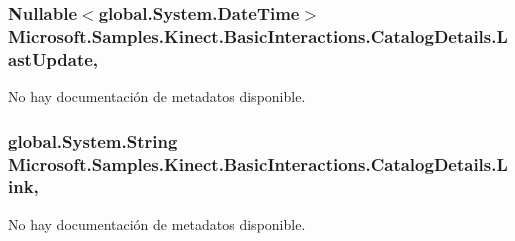 \hypertarget{class_microsoft_1_1_samples_1_1_kinect_1_1_basic_interactions_1_1_catalog_details_a43dfdfa238709c3c3c631fcdc8d0767e}{
\subsubsection[{Last\-Update}]{\setlength{\rightskip}{0pt plus 5cm}Nullable$<$global.\-System.\-Date\-Time$>$ Microsoft.\-Samples.\-Kinect.\-Basic\-Interactions.\-Catalog\-Details.\-Last\-Update\hspace{0.3cm}{\ttfamily [get]}, {\ttfamily [set]}}}\label{class_microsoft_1_1_samples_1_1_kinect_1_1_basic_interactions_1_1_catalog_details_a43dfdfa238709c3c3c631fcdc8d0767e}


No hay documentación de metadatos disponible. 

\hypertarget{class_microsoft_1_1_samples_1_1_kinect_1_1_basic_interactions_1_1_catalog_details_a92ff466a17ea6948b3dfd91c0d30b612}{
\subsubsection[{Link}]{\setlength{\rightskip}{0pt plus 5cm}global.\-System.\-String Microsoft.\-Samples.\-Kinect.\-Basic\-Interactions.\-Catalog\-Details.\-Link\hspace{0.3cm}{\ttfamily [get]}, {\ttfamily [set]}}}\label{class_microsoft_1_1_samples_1_1_kinect_1_1_basic_interactions_1_1_catalog_details_a92ff466a17ea6948b3dfd91c0d30b612}


No hay documentación de metadatos disponible. 

